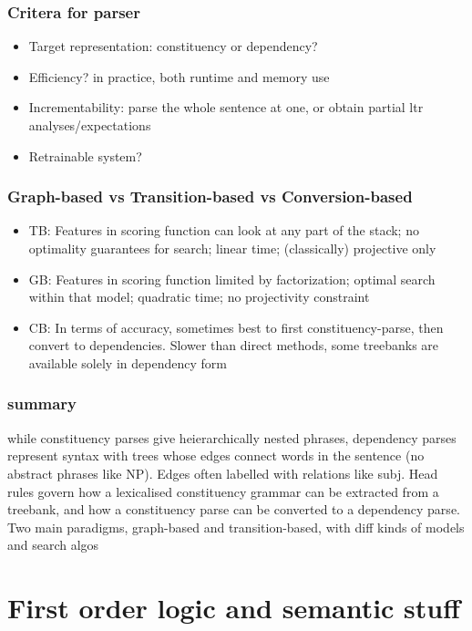 \documentclass[landscape, 8pt]{extarticle}
\begin{document}
\begin{multicols}{3}
\subsubsection{Critera for parser}

\begin{itemize}
    \setlength\itemsep{0em}
    \item Target representation: constituency or dependency?
    \item Efficiency? in practice, both runtime and memory use
    \item Incrementability: parse the whole sentence at one, or obtain partial ltr analyses/expectations
    \item Retrainable system?
\end{itemize}

\subsubsection{Graph-based vs Transition-based vs Conversion-based}
\begin{itemize}
    \setlength\itemsep{0em}
    \item TB: Features in scoring function can look at any part of the stack; no optimality guarantees for search; linear time; (classically) projective only
    \item GB: Features in scoring function limited by factorization; optimal search within that model; quadratic time; no projectivity constraint
    \item CB: In terms of accuracy, sometimes best to first constituency-parse, then convert to dependencies. Slower than direct methods, some treebanks are available solely in dependency form
\end{itemize}

\subsubsection{summary}
while constituency parses give heierarchically nested phrases, dependency parses represent syntax with trees whose edges connect words in the sentence (no abstract phrases like NP). Edges often labelled with relations like subj. Head rules govern how a lexicalised constituency grammar can be extracted from a treebank, and how a constituency parse can be converted to a dependency parse. Two main paradigms, graph-based and transition-based, with diff kinds of models and search algos

\newpage
\section{First order logic and semantic stuff}


\end{multicols}
\end{document}
